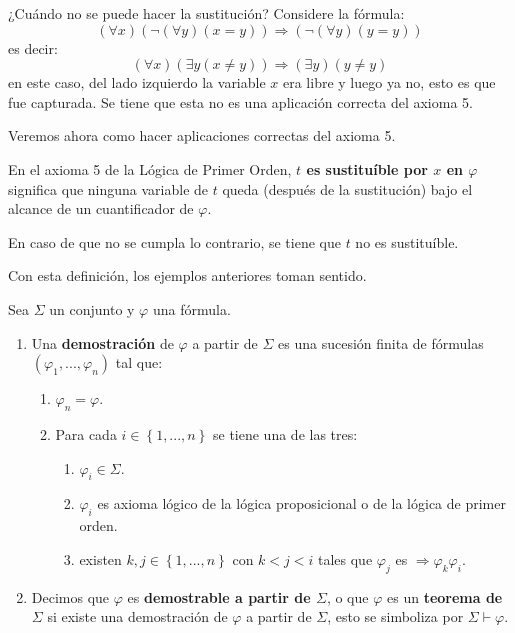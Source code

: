 \documentclass[12pt]{report}
\theoremstyle{largebreak}
\begin{document}
    \begin{exa}
        ¿Cuándo no se puede hacer la sustitución? Considere la fórmula:
        \begin{equation*}
            (\forall x)(\neg(\forall y)(x=y))\Rightarrow(\neg(\forall y)(y=y))
        \end{equation*}
        es decir:
        \begin{equation*}
            (\forall x)(\exists y(x\neq y))\Rightarrow (\exists y)(y\neq y)
        \end{equation*}
        en este caso, del lado izquierdo la variable $x$ era libre y luego ya no, esto es que fue capturada. Se tiene que esta no es una aplicación correcta del axioma 5.
    \end{exa}

    Veremos ahora como hacer aplicaciones correctas del axioma 5.

    \begin{mydef}
        En el axioma 5 de la Lógica de Primer Orden, \textbf{$t$ es sustituíble por $x$ en $\varphi$} significa que ninguna variable de $t$ queda (después de la sustitución) bajo el alcance de un cuantificador de $\varphi$.

        En caso de que no se cumpla lo contrario, se tiene que $t$ no es sustituíble.
    \end{mydef}

    Con esta definición, los ejemplos anteriores toman sentido.

    \begin{mydef}
        Sea $\Sigma$ un conjunto y $\varphi$ una fórmula.
        \begin{enumerate}
            \item Una \textbf{demostración} de $\varphi$ a partir de $\Sigma$ es una sucesión finita de fórmulas $(\varphi_1,...,\varphi_n)$ tal que:
            \begin{enumerate}
                \item $\varphi_n=\varphi$.
                \item Para cada $i\in\left\{1,...,n\right\}$ se tiene una de las tres:
                \begin{enumerate}
                    \item $\varphi_i\in\Sigma$.
                    \item $\varphi_i$ es axioma lógico de la lógica proposicional o de la lógica de primer orden.
                    \item existen $k,j\in\left\{1,...,n\right\}$ con $k<j<i$ tales que $\varphi_j$ es $\Rightarrow\varphi_k\varphi_i$.
                \end{enumerate}
            \end{enumerate}
            \item Decimos que $\varphi$ es \textbf{demostrable a partir de $\Sigma$}, o que $\varphi$ es un \textbf{teorema de $\Sigma$} si existe una demostración de $\varphi$ a partir de $\Sigma$, esto se simboliza por $\Sigma\vdash\varphi$.
        \end{enumerate}
    \end{mydef}
\end{document}

